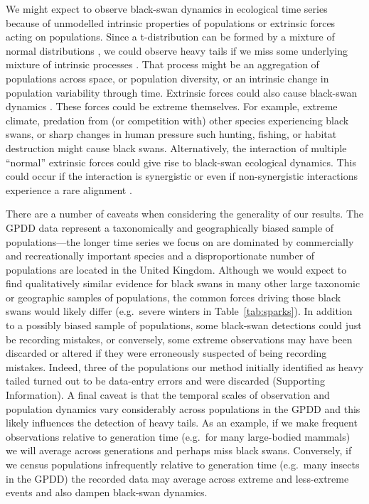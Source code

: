 We might expect to observe black-swan dynamics in ecological time series
because of unmodelled intrinsic properties of populations or extrinsic forces
acting on populations. Since a t-distribution can be formed by a mixture of
normal distributions \citep[with the same mean and inverse-gamma-distributed
variances,][]{gelman2014}, we could observe heavy tails if we miss some
underlying mixture of intrinsic processes \citep{allen2001}. That process
might be an aggregation of populations across space, or population diversity,
or an intrinsic change in population variability through time. Extrinsic
forces could also cause black-swan dynamics \citep[e.g.][]{nunez2012}. These
forces could be extreme themselves. For example, extreme climate, predation
from (or competition with) other species experiencing black swans, or sharp
changes in human pressure such hunting, fishing, or habitat destruction might
cause black swans. Alternatively, the interaction of multiple ``normal''
extrinsic forces could give rise to black-swan ecological dynamics. This could
occur if the interaction is synergistic \citep[e.g.][]{kirby2009} or even if
non-synergistic interactions experience a rare alignment \citep{denny2009}.

There are a number of caveats when considering the generality of our results.
The GPDD data represent a taxonomically and geographically biased sample of
populations---the longer time series we focus on are dominated by commercially
and recreationally important species and a disproportionate number of
populations are located in the United Kingdom. Although we would expect to find
qualitatively similar evidence for black swans in many other large taxonomic or
geographic samples of populations, the common forces driving those black swans
would likely differ (e.g.~severe winters in Table~\ref{tab:sparks}). In
addition to a possibly biased sample of populations, some black-swan detections
could just be recording mistakes, or conversely, some extreme observations may
have been discarded or altered if they were erroneously suspected of being
recording mistakes. Indeed, three of the populations our method initially
identified as heavy tailed turned out to be data-entry errors and were
discarded (Supporting Information). A final caveat is that the temporal scales
of observation and population dynamics vary considerably across populations in
the GPDD and this likely influences the detection of heavy tails. As an
example, if we make frequent observations relative to generation time (e.g.~for
many large-bodied mammals) we will average across generations and perhaps miss
black swans. Conversely, if we census populations infrequently relative to
generation time (e.g.~many insects in the GPDD) the recorded data may average
across extreme and less-extreme events and also dampen black-swan dynamics.

